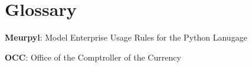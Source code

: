 \newcommand{\definition}[2]{
	\textbf{#1}: #2\newline
}

\section{Glossary}

\thispagestyle{section_start_style}

\definition{Meurpyl}{Model Enterprise Usage Rules for the Python Lanugage}

\definition{OCC}{Office of the Comptroller of the Currency}